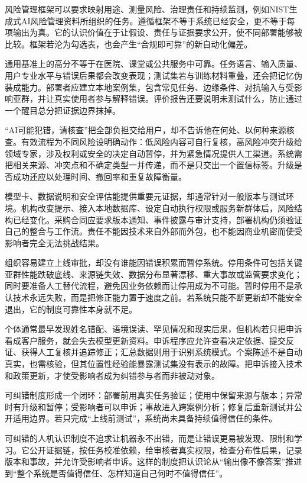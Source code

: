 风险管理框架可以要求映射用途、测量风险、治理责任和持续监测，例如NIST生成式AI风险管理资料所组织的任务\parencite{nist2024}。遵循框架不等于系统已经安全，更不等于每项输出为真。它的认识价值在于让假设、责任与证据要求公开，使不同部署能够被比较。框架若沦为勾选表，也会产生“合规即可靠”的新自动化偏差。

通用基准上的高分不等于在医院、课堂或公共服务中可靠。任务语言、输入质量、用户专业水平与错误后果都会改变表现；测试集若与训练材料重叠，还会把记忆伪装成能力。部署者应建立本地案例集，包含常见任务、边缘条件、对抗输入与受影响亚群，并让真实使用者参与解释错误。评价报告还要说明未测试什么，防止通过一个醒目总分把证据边界抹掉。

“AI可能犯错，请核查”把全部负担交给用户，却不告诉他在何处、以何种来源核查。有效流程为不同风险设明确动作：低风险内容可自行复核，高风险冲突升级给领域专家，涉及权利或安全的决定自动暂停，并为紧急情况提供人工渠道。系统需把相关来源、冲突点和不确定类型一并传递，而不是只交出一个置信标签。升级是否成功还应以处理时间、撤回率和重复故障衡量。

模型卡、数据说明和安全评估能提供重要元证据，却通常针对一般版本与测试环境。机构改变提示、接入本地数据库、设定自动执行权限或服务新群体后，风险结构已经变化。采购合同应要求版本通知、事件披露与审计支持，部署机构仍须验证自己的整合与工作流。责任不能因技术来自外部而外包，也不能因商业机密而使受影响者完全无法挑战结果。

组织容易建立上线审批，却没有谁能因错误积累而暂停系统。停用条件可包括关键亚群性能跌破底线、来源链失效、数据分布显著漂移、重大事故或监管要求变化；同时要准备人工替代流程，避免因业务依赖而让停用成为不可能。暂时停用不是承认技术永远失败，而是把修正能力置于速度之前。若系统只能不断更新却不能安全退出，它的制度可靠性本身就不足。

个体通常最早发现姓名错配、语境误读、罕见情况和现实后果，但机构若只把申诉看成客户服务，就会失去模型更新资料。申诉程序应允许查看决定依据、提交反证、获得人工复核并追踪修正；汇总数据则用于识别系统模式。个案陈述不是自动真实，也需核验，但其位置性经验能暴露测试集没有表示的故障。把申诉接入技术和政策更新，才使受影响者成为纠错参与者而非被动对象。

\begin{argumentbox}
可纠错制度形成一个闭环：部署前用真实任务验证；使用中保留来源与版本；异常时有升级和暂停；受影响者可以申诉；事故进入跨案例分析；修复后重新测试并公开适用边界。若只完成“上线前测试”，系统尚未具备持续值得信任的条件。
\end{argumentbox}

可纠错的人机认识制度不追求让机器永不出错，而是让错误更易被发现、限制和学习。它公开证据链，按任务校准依赖，给审核者真实权限，检查分布性后果，记录版本和事故，并允许受影响者申诉。这样的制度把认识论从“输出像不像答案”推进到“整个系统是否值得信任、怎样知道自己何时不值得信任”。
